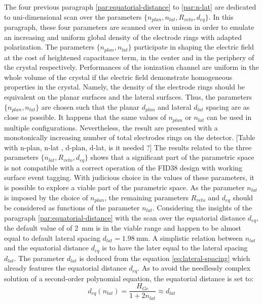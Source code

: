 The four previous paragraph \ref{par:equatorial-distance} to \ref{par:n-lat} are dedicated to uni-dimensional scan over the parameters $\{n_{plan}, n_{lat}, R_{veto}, d_{eq}\}$. In this paragraph, these four parameters are scanned over in unison in order to emulate an increasing and uniform global density of the electrode rings with adapted polarization.
The parameters $\{n_{plan}, n_{lat} \}$ participate in shaping the electric field at the cost of heightened capacitance term, in the center and in the periphery of the crystal respectively. Performances of the ionization channel are uniform in the whole volume of the crystal if the electric field demonstrate homogeneous properties in the crystal. Namely, the density of the electrode rings should be equivalent on the planar surfaces and the lateral surfaces. Thus, the parameters $\{n_{plan}, n_{lat} \}$ are chosen such that the planar $d_{plan}$ and lateral $d_{lat}$ spacing are as close as possible. It happens that the same values of $n_{plan}$ or $n_{lat}$ can be used in multiple configurations. Nevertheless, the result are presented with a monotonically increasing number of total electrodes rings on the detector.
{\color{red} [Table with n-plan, n-lat , d-plan, d-lat, is it needed ?]}
The results related to the three parameters $\{n_{lat}, R_{veto}, d_{eq}\}$ shows that a significant part of the parametric space is not compatible with a correct operation of the FID38 design with working surface event tagging. With judicious choice in the values of these parameters, it is possible to explore a viable part of the parametric space. As the parameter $n_{lat}$ is imposed by the choice of $n_{plan}$, the remaining parameters $R_{veto}$ and $d_{eq}$ should be considered as functions of the parameter $n_{lat}$. Considering the insights of the paragraph \ref{par:equatorial-distance} with the scan over the equatorial distance $d_{eq}$, the default value of of \SI{2}{\mm} is in the viable range and happen to be almost equal to default lateral spacing $d_{lat} = \SI{1.98}{\mm}$. A simplistic relation between $n_{lat}$ and the equatorial distance $d_{eq}$ is to have the later equal to the lateral spacing $d_{lat}$. The parameter $d_{lat}$ is deduced from the equation \ref{eq:lateral-spacing} which already features the equatorial distance $d_{eq}$. As to avoid the needlessly complex solution of a second-order polynomial equation, the equatorial distance is set to:
\begin{equation}
d_{eq} \left( n_{lat} \right) = \frac{H_{Ge}}{1 + 2 n_{lat}} \approx d_{lat}
\end{equation}
